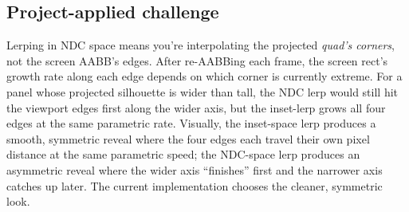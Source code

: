 \documentclass{article}
\begin{document}
\subsection*{Project-applied challenge}
Lerping in NDC space means you're interpolating the projected \emph{quad's corners}, not
the screen AABB's edges. After re-AABBing each frame, the screen rect's growth rate
along each edge depends on which corner is currently extreme. For a panel whose
projected silhouette is wider than tall, the NDC lerp would still hit the viewport
edges first along the wider axis, but the inset-lerp grows all four edges at the same
parametric rate. Visually, the inset-space lerp produces a smooth, symmetric reveal
where the four edges each travel their own pixel distance at the same parametric speed;
the NDC-space lerp produces an asymmetric reveal where the wider axis ``finishes'' first
and the narrower axis catches up later. The current implementation chooses the cleaner,
symmetric look.
\end{document}
